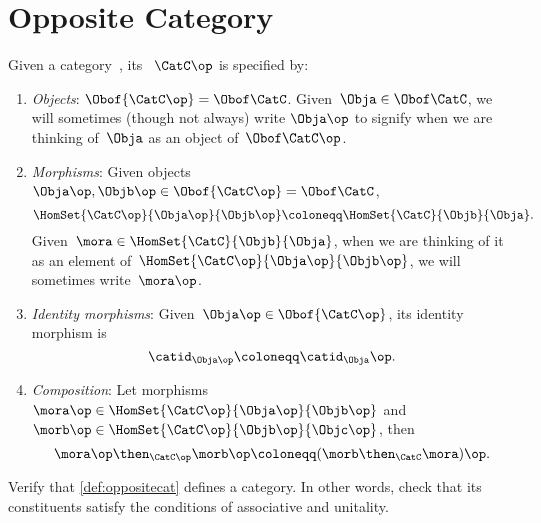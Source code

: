 
\section{Opposite Category}

\begin{ctdefinition}
    \label{def:opposite-category}
    \label{def:oppositecat}
    Given a category~\CatC, its \emph{}~$\CatC\op$ is specified by:
    \begin{enumerate}
        \item \emph{Objects}: $\Obof{\CatC\op} = \Obof\CatC$.
              Given~$\Obja \in  \Obof\CatC$, we will sometimes (though not always) write $\Obja\op$ to signify when we are thinking of~$\Obja$ as an object of~$\Obof\CatC\op$.

        \item \emph{Morphisms}: Given objects~$\Obja\op,  \Objb\op \in \Obof{\CatC\op} = \Obof\CatC$,
              \begin{equation}
                  \label{eq:homset-op-cat}
                  \HomSet{\CatC\op}{\Obja\op}{\Objb\op} \coloneqq \HomSet{\CatC}{\Objb}{\Obja}.
              \end{equation}
              Given~$\mora \in \HomSet{\CatC}{\Objb}{\Obja}$, when we are thinking of it as an element of~$\HomSet{\CatC\op}{\Obja\op}{\Objb\op}$, we will sometimes write~$\mora\op$.
        \item \emph{Identity morphisms}: Given~$\Obja\op \in \Obof{\CatC\op}$, its identity morphism is
              \begin{equation}
                  \catid_{\Obja\op} \coloneqq \catid_{\Obja}\op.
              \end{equation}
        \item \emph{Composition}: Let morphisms~$\mora\op \in \HomSet{\CatC\op}{\Obja\op}{\Objb\op}$ and~$\morb\op \in \HomSet{\CatC\op}{\Objb\op}{\Objc\op}$, then
              \begin{equation}
                  \mora\op \then_{\CatC\op} \morb\op \coloneqq (\morb \then_\CatC \mora)\op.
              \end{equation}
    \end{enumerate}
\end{ctdefinition}

\vfill
\begin{gradedexercise}
    \label{ex:OppositeCat}
    Verify that \cref{def:oppositecat} defines a category.
    In other words, check that its constituents satisfy the conditions of associative and unitality.
\end{gradedexercise}

